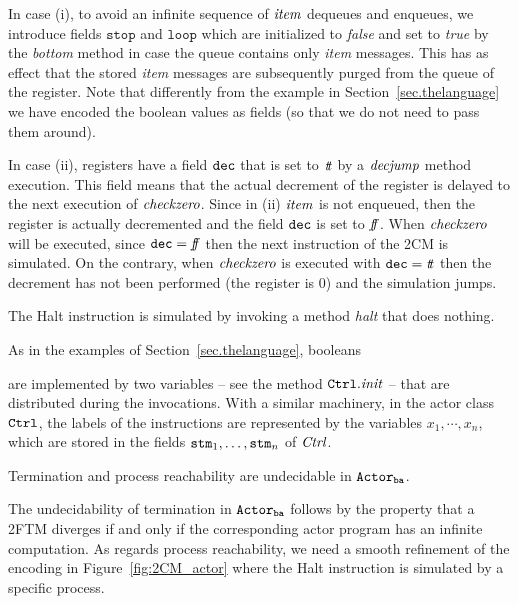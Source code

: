 \documentclass{LMCS}
\theoremstyle{plain}\newtheorem{proposition}[thm]{Proposition}
\theoremstyle{plain}\newtheorem{lemma}[thm]{Lemma}
\theoremstyle{plain}\newtheorem{theorem}[thm]{Theorem}
\theoremstyle{plain}\newtheorem{corollary}[thm]{Corollary}
\newif\ifconf \conffalse
\newcommand{\false}{{\it f\hspace{-3pt}f}}
\newcommand{\true}{{\it t\hspace{-2.3pt}t}}
\newcommand{\adef}[1]{{\tt #1}}
\newcommand{\actba}{${\tt Actor_{\tt ba}}$}
\begin{document}
In case (i), to avoid an infinite sequence of ${\it item}$ dequeues and 
enqueues, we introduce fields $\mathtt{stop}$ and $\mathtt{loop}$ which are  initialized to {\it false} and set to {\it true}
by the {\it bottom} method in case the queue contains only {\it item} messages.
This has as effect that the stored {\it item} messages are subsequently purged from the queue of the register. 
Note that differently from the example in Section~\ref{sec.thelanguage} we have encoded the boolean values
as fields (so that we do not need to pass them around).



In case (ii), registers have a field ${\tt dec}$  that is set to ${\true}$ by 
a ${\it decjump}$ method execution. This field means that the actual decrement
of the register is delayed to the next execution of ${\it checkzero}$. Since in 
(ii) ${\it item}$ is not enqueued, then the register is actually decremented and
the field ${\tt dec}$  is set to ${\false}$. When 
${\it checkzero}$ will be executed, since 
${\tt dec} = \false$  then the next instruction of the 2CM is simulated.
On the contrary, when  ${\it checkzero}$ is executed with ${\tt dec} = \true$
then the decrement has not been performed (the register is 0) and the simulation 
jumps.

The {\sf Halt} instruction is simulated by invoking a method {\it halt} that does nothing.

\ifconf
Booleans
\else
As in the examples of Section~\ref{sec.thelanguage}, booleans
\fi
are implemented by two variables 
-- see the method $\adef{Ctrl}.{\it init}$ -- that are distributed during the invocations. 
With a similar machinery, in the actor class $\adef{Ctrl}$,   the
labels of the instructions are represented 
by the variables $x_1,\cdots,x_n$, 
which are stored in the fields ${\tt stm}_1,\ldots,{\tt stm}_n$ of ${\it Ctrl}$.

\begin{thm}
\label{thm.undecidablestatefull}
Termination and process reachability 
are undecidable in {\actba}.
\end{thm}
The undecidability of termination in {\actba} follows by the
property that a 2FTM  diverges if and only if the corresponding actor program
has an infinite computation. As regards process reachability, we need a smooth
refinement of the encoding in Figure~\ref{fig:2CM_actor} where the {\sf Halt}
instruction is simulated by a specific process. 
\end{document}
